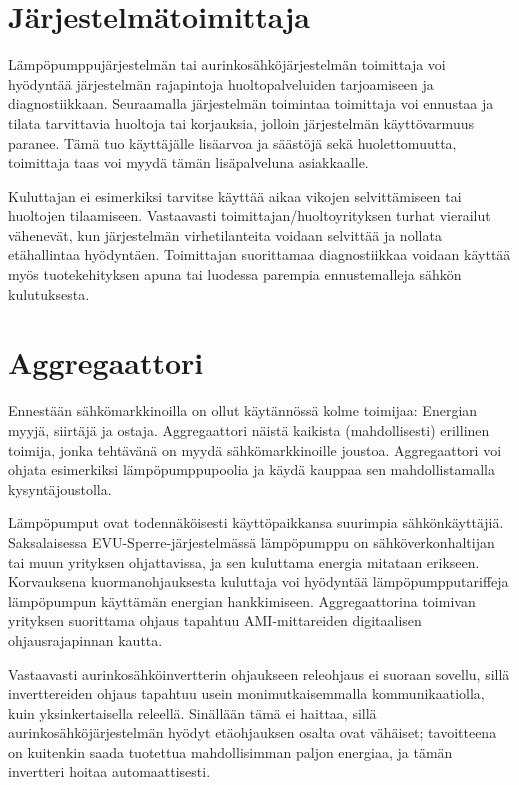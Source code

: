 \section{Järjestelmätoimittaja}

  Lämpöpumppujärjestelmän tai aurinkosähköjärjestelmän toimittaja voi hyödyntää järjestelmän rajapintoja huoltopalveluiden tarjoamiseen ja diagnostiikkaan. Seuraamalla järjestelmän toimintaa toimittaja voi ennustaa ja tilata tarvittavia huoltoja tai korjauksia, jolloin järjestelmän käyttövarmuus paranee. Tämä tuo käyttäjälle lisäarvoa ja säästöjä sekä huolettomuutta, toimittaja taas voi myydä tämän lisäpalveluna asiakkaalle. 
  
  Kuluttajan ei esimerkiksi tarvitse käyttää aikaa vikojen selvittämiseen tai huoltojen tilaamiseen. Vastaavasti toimittajan/huoltoyrityksen turhat vierailut vähenevät, kun järjestelmän virhetilanteita voidaan selvittää ja nollata etähallintaa hyödyntäen. Toimittajan suorittamaa diagnostiikkaa voidaan käyttää myös tuotekehityksen apuna tai luodessa parempia ennustemalleja sähkön kulutuksesta.

\section{Aggregaattori}

  Ennestään sähkömarkkinoilla on ollut käytännössä kolme toimijaa: Energian myyjä, siirtäjä ja ostaja. Aggregaattori näistä kaikista (mahdollisesti) erillinen toimija, jonka tehtävänä on myydä sähkömarkkinoille joustoa. Aggregaattori voi ohjata esimerkiksi lämpöpumppupoolia ja käydä kauppaa sen mahdollistamalla kysyntäjoustolla.

  Lämpöpumput ovat todennäköisesti käyttöpaikkansa suurimpia sähkönkäyttäjiä. Saksalaisessa EVU-Sperre-järjestelmässä lämpöpumppu on sähköverkonhaltijan tai muun yrityksen ohjattavissa, ja sen kuluttama energia mitataan erikseen. Korvauksena kuormanohjauksesta kuluttaja voi hyödyntää lämpöpumpputariffeja lämpöpumpun käyttämän energian hankkimiseen. Aggregaattorina toimivan yrityksen suorittama ohjaus tapahtuu AMI-mittareiden digitaalisen ohjausrajapinnan kautta. \parencite{enwg, VDEARN4100}

  Vastaavasti aurinkosähköinvertterin ohjaukseen releohjaus ei suoraan sovellu, sillä inverttereiden ohjaus tapahtuu usein monimutkaisemmalla kommunikaatiolla, kuin yksinkertaisella releellä. Sinällään tämä ei haittaa, sillä aurinkosähköjärjestelmän hyödyt etäohjauksen osalta ovat vähäiset; tavoitteena on kuitenkin saada tuotettua mahdollisimman paljon energiaa, ja tämän invertteri hoitaa automaattisesti.

